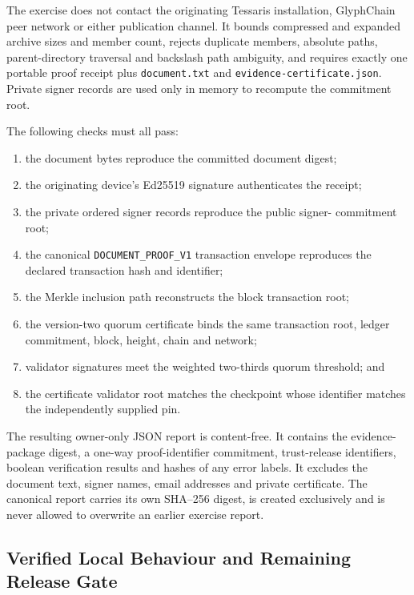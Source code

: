 The exercise does not contact the originating Tessaris installation, GlyphChain
peer network or either publication channel.  It bounds compressed and expanded
archive sizes and member count, rejects duplicate members, absolute paths,
parent-directory traversal and backslash path ambiguity, and requires exactly
one portable proof receipt plus \texttt{document.txt} and
\texttt{evidence-certificate.json}.  Private signer records are used only in
memory to recompute the commitment root.

The following checks must all pass:

\begin{enumerate}[leftmargin=*]
  \item the document bytes reproduce the committed document digest;
  \item the originating device's Ed25519 signature authenticates the receipt;
  \item the private ordered signer records reproduce the public signer-
        commitment root;
  \item the canonical \texttt{DOCUMENT\_PROOF\_V1} transaction envelope
        reproduces the declared transaction hash and identifier;
  \item the Merkle inclusion path reconstructs the block transaction root;
  \item the version-two quorum certificate binds the same transaction root,
        ledger commitment, block, height, chain and network;
  \item validator signatures meet the weighted two-thirds quorum threshold; and
  \item the certificate validator root matches the checkpoint whose identifier
        matches the independently supplied pin.
\end{enumerate}

The resulting owner-only JSON report is content-free.  It contains the evidence-
package digest, a one-way proof-identifier commitment, trust-release identifiers,
boolean verification results and hashes of any error labels.  It excludes the
document text, signer names, email addresses and private certificate.  The
canonical report carries its own SHA--256 digest, is created exclusively and is
never allowed to overwrite an earlier exercise report.

\subsection{Verified Local Behaviour and Remaining Release Gate}

